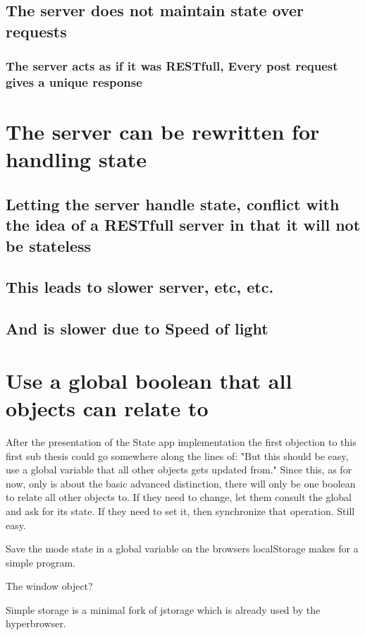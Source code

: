 \documentclass[english]{ifimaster}
\begin{document}
\subsection{The server does not maintain state over requests}
\subsubsection{The server acts as if it was RESTfull, Every post request gives a unique response}

\section{The server can be rewritten for handling state}
\subsection{Letting the server handle state, conflict with the idea of a RESTfull server in that it will not be stateless}
\subsection{This leads to slower server, etc, etc.}
\subsection{And is slower due to Speed of light}

\section{Use a global boolean that all objects can relate to}
After the presentation of the State app implementation the first objection to this first sub thesis could go somewhere along the lines of: "But this should be easy, use a global variable that all other objects gets updated from." Since this, as for now, only is about the basic advanced distinction, there will only be one boolean to relate all other objects to. If they need to change, let them consult the global and ask for its state. If they need to set it, then synchronize that operation. Still easy.

Save the mode state in a global variable on the browsers localStorage makes for a simple program.

The window object?

Simple storage is a minimal fork of jstorage which is already used by the hyperbrowser.
\end{document}
